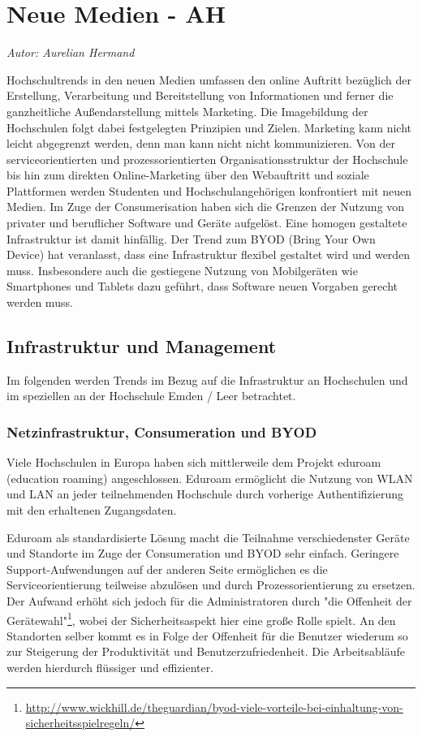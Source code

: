 \section{Neue Medien - AH}
\textit{Autor: Aurelian Hermand}


Hochschultrends in den neuen Medien umfassen den online Auftritt bezüglich der Erstellung, Verarbeitung und Bereitstellung von Informationen und ferner die ganzheitliche Außendarstellung mittels Marketing. Die Imagebildung der Hochschulen folgt dabei festgelegten Prinzipien und Zielen. Marketing kann nicht leicht abgegrenzt werden, denn man kann nicht nicht kommunizieren. Von der serviceorientierten und prozessorientierten Organisationsstruktur der Hochschule bis hin zum direkten Online-Marketing über den Webauftritt und soziale Plattformen werden Studenten und Hochschulangehörigen konfrontiert mit neuen Medien. Im Zuge der Consumerisation haben sich die Grenzen der Nutzung von privater und beruflicher Software und Geräte aufgelöst. Eine homogen gestaltete Infrastruktur ist damit hinfällig. Der Trend zum BYOD (Bring Your Own Device) hat veranlasst, dass eine Infrastruktur flexibel gestaltet wird und werden muss. Insbesondere auch die gestiegene Nutzung von Mobilgeräten wie Smartphones und Tablets dazu geführt, dass Software neuen Vorgaben gerecht werden muss.


\subsection{Infrastruktur und Management}
Im folgenden werden Trends im Bezug auf die Infrastruktur an Hochschulen und im speziellen an der Hochschule Emden / Leer betrachtet. 

\subsubsection{Netzinfrastruktur, Consumeration und BYOD}
Viele Hochschulen in Europa haben sich mittlerweile dem Projekt eduroam (education roaming) angeschlossen. Eduroam ermöglicht die Nutzung von WLAN und LAN an jeder teilnehmenden Hochschule durch vorherige Authentifizierung mit den erhaltenen Zugangsdaten.

Eduroam als standardisierte Lösung macht die Teilnahme verschiedenster Geräte und Standorte im Zuge der Consumeration und BYOD sehr einfach. Geringere Support-Aufwendungen auf der anderen Seite ermöglichen es die Serviceorientierung teilweise abzulösen und durch Prozessorientierung zu ersetzen. Der Aufwand erhöht sich jedoch für die Administratoren durch "die Offenheit der Gerätewahl"\footnote{\url{http://www.wickhill.de/theguardian/byod-viele-vorteile-bei-einhaltung-von-sicherheitsspielregeln/}}, wobei der Sicherheitsaspekt hier eine große Rolle spielt. An den Standorten selber kommt es in Folge der Offenheit für die Benutzer wiederum so zur Steigerung der Produktivität und Benutzerzufriedenheit. Die Arbeitsabläufe werden hierdurch flüssiger und effizienter.


